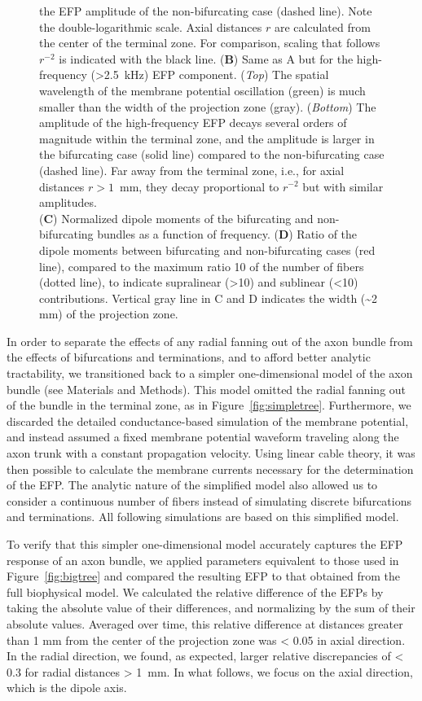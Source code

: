 \documentclass[]{elife}
\begin{document}
\begin{figure}[htbp]
{the EFP amplitude of the non-bifurcating case (dashed line). Note the
double-logarithmic scale. Axial distances $r$ are calculated from the
center of the terminal zone. For comparison, scaling that follows
$r^{-2}$ is indicated with the black line. (\textbf{B}) Same as A but
for the high-frequency (\textgreater{}2.5~kHz) EFP component.
(\emph{Top}) The spatial wavelength of the membrane potential
oscillation (green) is much smaller than the width of the projection
zone (gray). (\emph{Bottom}) The amplitude of the high-frequency EFP
decays several orders of magnitude within the terminal zone, and the
amplitude is larger in the bifurcating case (solid line) compared to the
non-bifurcating case (dashed line). Far away from the terminal zone,
i.e., for axial distances $r> 1$~mm, they decay proportional to
$r^{-2}$ but with similar amplitudes.\\
(\textbf{C}) Normalized dipole moments of the bifurcating and
non-bifurcating bundles as a function of frequency. (\textbf{D}) Ratio
of the dipole moments between bifurcating and non-bifurcating cases (red
line), compared to the maximum ratio 10 of the number of fibers (dotted
line), to indicate supralinear (\textgreater{}10) and sublinear
(\textless{}10) contributions. Vertical gray line in C and D indicates
the width (\textasciitilde{}2 mm) of the projection zone.}
\end{figure}

In order to separate the effects of any radial fanning out of the axon
bundle from the effects of bifurcations and terminations, and to afford
better analytic tractability, we transitioned back to a simpler
one-dimensional model of the axon bundle (see Materials and Methods).
This model omitted the radial fanning out of the bundle in the terminal
zone, as in Figure~\ref{fig:simpletree}. Furthermore, we discarded the
detailed conductance-based simulation of the membrane potential, and
instead assumed a fixed membrane potential waveform traveling along the
axon trunk with a constant propagation velocity. Using linear cable
theory, it was then possible to calculate the membrane currents
necessary for the determination of the EFP. The analytic nature of the
simplified model also allowed us to consider a continuous number of
fibers instead of simulating discrete bifurcations and terminations. All
following simulations are based on this simplified model.

To verify that this simpler one-dimensional model accurately captures
the EFP response of an axon bundle, we applied parameters equivalent to
those used in Figure~\ref{fig:bigtree} and compared the resulting EFP to
that obtained from the full biophysical model. We calculated the
relative difference of the EFPs by taking the absolute value of their
differences, and normalizing by the sum of their absolute values.
Averaged over time, this relative difference at distances greater than 1
mm from the center of the projection zone was \textless{} 0.05 in axial
direction. In the radial direction, we found, as expected, larger
relative discrepancies of \textless{} 0.3 for radial distances
\textgreater{} 1~mm. In what follows, we focus on the axial direction,
which is the dipole axis.
\end{document}
